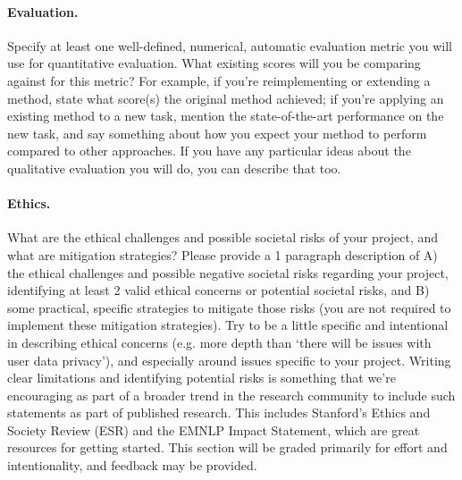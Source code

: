 \documentclass{article}
\begin{document}
\paragraph{Evaluation.}
Specify at least one well-defined, numerical, automatic evaluation metric you will use for quantitative evaluation. 
What existing scores will you be comparing against for this metric? For example, if you're reimplementing or extending a method, state what score(s) the original method achieved; if you're applying an existing method to a new task, mention the state-of-the-art performance on the new task, and say something about how you expect your method to perform compared to other approaches.
If you have any particular ideas about the qualitative evaluation you will do, you can describe that too.

\paragraph{Ethics.}
What are the ethical challenges and possible societal risks of your project,
and what are mitigation strategies? Please provide a 1 paragraph description of A) the ethical challenges and possible negative societal risks regarding your project, identifying at least 2 valid ethical concerns or potential
societal risks, and B) some practical, specific strategies to mitigate those
risks (you are not required to implement these mitigation strategies). Try
to be a little specific and intentional in describing ethical concerns (e.g.
more depth than ‘there will be issues with user data privacy’), and especially around issues specific to your project. Writing clear limitations and
identifying potential risks is something that we’re encouraging as part of
a broader trend in the research community to include such statements as
part of published research. This includes Stanford’s Ethics and Society
Review (ESR) and the EMNLP Impact Statement, which are great resources for getting started. This section will be graded primarily for effort
and intentionality, and feedback may be provided.



\end{document}
